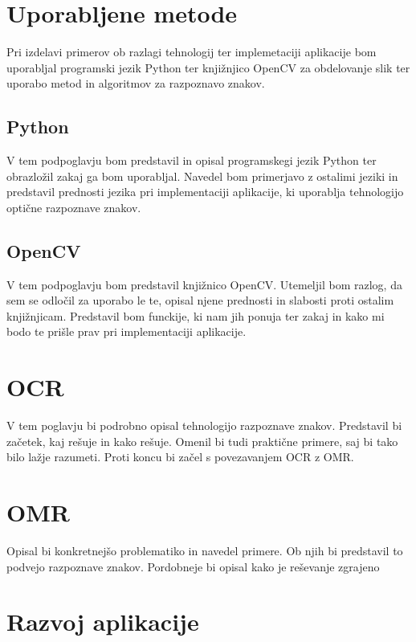 \documentclass[a4paper, 12pt]{book}
\begin{document}
\chapter{Uporabljene metode}
\label{ch2}

Pri izdelavi primerov ob razlagi tehnologij ter implemetaciji aplikacije bom uporabljal programski jezik Python ter knjižnjico OpenCV za obdelovanje slik ter uporabo metod in algoritmov za razpoznavo znakov.


\section{Python}

V tem podpoglavju bom predstavil in opisal programskegi jezik Python ter obrazložil zakaj ga bom uporabljal. Navedel bom primerjavo z ostalimi jeziki in predstavil prednosti jezika pri implementaciji aplikacije, ki uporablja tehnologijo optične razpoznave znakov.


\section{OpenCV}

V tem podpoglavju bom predstavil knjižnico OpenCV. Utemeljil bom razlog, da sem se odločil za uporabo le te, opisal njene prednosti in slabosti proti ostalim knjižnjicam. Predstavil bom funckije, ki nam jih ponuja ter zakaj in kako mi bodo te prišle prav pri implementaciji aplikacije.


\chapter{OCR}
\label{ch3}

V tem poglavju bi podrobno opisal tehnologijo razpoznave znakov. Predstavil bi začetek, kaj rešuje in kako rešuje. Omenil bi tudi praktične primere, saj bi tako bilo lažje razumeti. Proti koncu bi začel s povezavanjem OCR z OMR.


\chapter{OMR}  %
\label{ch4}

Opisal bi konkretnejšo problematiko in navedel primere. Ob njih bi predstavil to podvejo razpoznave znakov. Pordobneje bi opisal kako je reševanje zgrajeno


\chapter{Razvoj aplikacije} 
\label{ch5}
\end{document}
